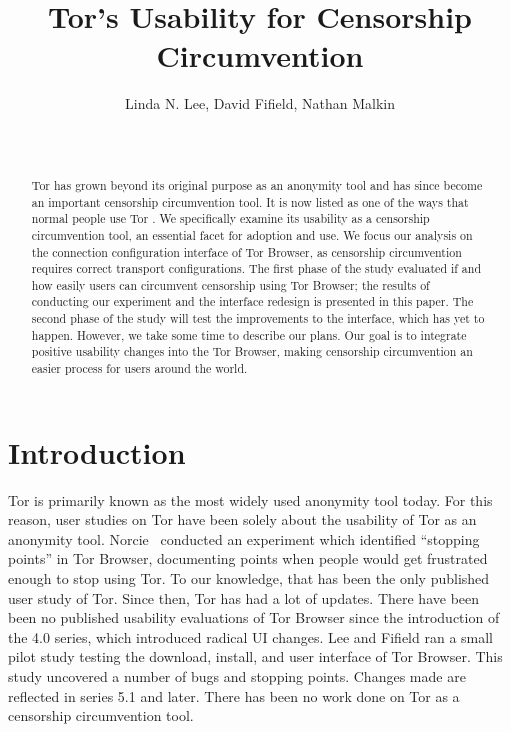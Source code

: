 \documentclass{template}
\begin{document}
\title{Tor's Usability for Censorship Circumvention}
\author{
 \alignauthor Linda N. Lee, David Fifield, Nathan Malkin \\
   \vspace{0.5em}
    \\
   \\
}
\maketitle

\begin{abstract}
Tor has grown beyond its original purpose as an anonymity tool and has 
since become an important censorship circumvention tool. It is now listed
as one of the ways that normal people use Tor \cite{whotor}.
We specifically examine its usability as a censorship circumvention tool,
an essential facet for adoption and use.  
We focus our analysis on the connection configuration interface of Tor Browser,
as censorship circumvention requires correct transport configurations.
The first phase of the study evaluated if and how easily users can circumvent censorship 
using Tor Browser; the results of conducting our experiment and the interface redesign
is presented in this paper. The second phase
of the study will test the improvements to the interface, which has yet to happen. However, we take
some time to describe our plans. 
Our goal is to integrate positive usability changes into the Tor Browser, making
censorship circumvention an easier process for users around the world. 

\end{abstract}


\section{Introduction}
Tor is primarily known as the most widely used anonymity tool today. 
For this reason, user studies on Tor have been solely about the usability of Tor as an
anonymity tool. Norcie~\cite{norcie2012eliminating} conducted an experiment which identified 
``stopping points'' in Tor Browser, documenting points when people would get frustrated enough
to stop using Tor. To our knowledge, that has been the only published user study of Tor. 
Since then, Tor has had a lot of updates. There have been been no published usability evaluations of
Tor Browser since the introduction of the 4.0 series, which introduced radical UI changes. 
Lee and Fifield \cite {uxsprint} ran a small pilot study testing the download, install, and user interface of Tor Browser. 
This study uncovered a number of bugs and stopping points. Changes made are reflected in series 
5.1 and later. There has been no work done on Tor as a censorship circumvention tool. 
\end{document}
